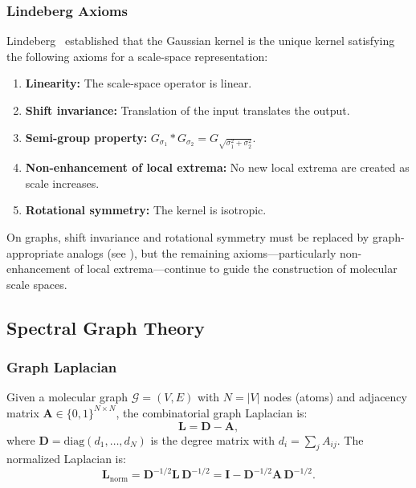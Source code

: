 \documentclass[12pt,a4paper]{article}
\newcommand{\cG}{\mathcal{G}}
\newcommand{\Lap}{\bm{L}}
\newcommand{\adj}{\bm{A}}
\newcommand{\degmat}{\bm{D}}
\begin{document}
\subsubsection{Lindeberg Axioms}

Lindeberg~\cite{lindeberg1994scalespace} established that the Gaussian kernel is the unique kernel satisfying the following axioms for a scale-space representation:
\begin{enumerate}
    \item \textbf{Linearity:} The scale-space operator is linear.
    \item \textbf{Shift invariance:} Translation of the input translates the output.
    \item \textbf{Semi-group property:} $G_{\sigma_1} * G_{\sigma_2} = G_{\sqrt{\sigma_1^2 + \sigma_2^2}}$.
    \item \textbf{Non-enhancement of local extrema:} No new local extrema are created as scale increases.
    \item \textbf{Rotational symmetry:} The kernel is isotropic.
\end{enumerate}
On graphs, shift invariance and rotational symmetry must be replaced by graph-appropriate analogs (see ), but the remaining axioms---particularly non-enhancement of local extrema---continue to guide the construction of molecular scale spaces.

\subsection{Spectral Graph Theory}\label{sec:bg_spectral}

\subsubsection{Graph Laplacian}

Given a molecular graph $\cG = (V, E)$ with $N = |V|$ nodes (atoms) and adjacency matrix $\adj \in \{0,1\}^{N \times N}$, the combinatorial graph Laplacian is:
\begin{equation}\label{eq:laplacian}
    \Lap = \degmat - \adj,
\end{equation}
where $\degmat = \mathrm{diag}(d_1, \ldots, d_N)$ is the degree matrix with $d_i = \sum_j A_{ij}$. The normalized Laplacian is:
\begin{equation}\label{eq:norm_laplacian}
    \Lap_{\mathrm{norm}} = \degmat^{-1/2} \Lap\, \degmat^{-1/2} = \bm{I} - \degmat^{-1/2} \adj\, \degmat^{-1/2}.
\end{equation}
\end{document}
